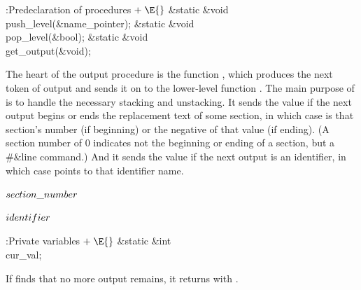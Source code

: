 \B{}:Predeclaration of procedures\X${}\mathrel+\E{}$\6
\&{static} \&{void} \\{push\_level}(\&{name\_pointer});\6
\&{static} \&{void} \\{pop\_level}(\&{bool});\6
\&{static} \&{void} \\{get\_output}(\&{void});\par
\fi

The heart of the output procedure is the function ,
which produces the next token of output and sends it on to the lower-level
function . The main purpose of  is to
handle the
necessary stacking and unstacking. It sends the value 
if the next output begins or ends the replacement text of some section,
in which case  is that section's number (if beginning) or the
negative of that value (if ending). (A section number of 0 indicates
not the beginning or ending of a section, but a \#\&{line} command.)
And it sends the value 
if the next output is an identifier, in which case
 points to that identifier name.

\Y\B\4\D$\\{section\_number}$ \5
\par
\B\4\D$\\{identifier}$ \5
\par
\Y\B\4:Private variables\X${}\mathrel+\E{}$\6
\&{static} \&{int} \\{cur\_val};\par
\fi

If  finds that no more output remains, it returns
with
.

